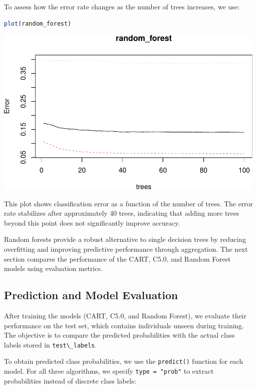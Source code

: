 \documentclass[
]{book}
\newcommand{\passthrough}[1]{#1}
\theoremstyle{definition}
\theoremstyle{definition}
\theoremstyle{definition}
\theoremstyle{definition}
\theoremstyle{remark}
\begin{document}
To assess how the error rate changes as the number of trees increases, we use:

\begin{lstlisting}[language=R]
plot(random_forest)
\end{lstlisting}

\begin{center}\includegraphics[width=0.7\linewidth]{tree_files/figure-latex/unnamed-chunk-20-1} \end{center}

This plot shows classification error as a function of the number of trees. The error rate stabilizes after approximately 40 trees, indicating that adding more trees beyond this point does not significantly improve accuracy.

Random forests provide a robust alternative to single decision trees by reducing overfitting and improving predictive performance through aggregation. The next section compares the performance of the CART, C5.0, and Random Forest models using evaluation metrics.

\subsection*{Prediction and Model Evaluation}\label{prediction-and-model-evaluation-1}

After training the models (CART, C5.0, and Random Forest), we evaluate their performance on the test set, which contains individuals unseen during training. The objective is to compare the predicted probabilities with the actual class labels stored in \passthrough{\lstinline!test\_labels!}.

To obtain predicted class probabilities, we use the \passthrough{\lstinline!predict()!} function for each model. For all three algorithms, we specify \passthrough{\lstinline!type = "prob"!} to extract probabilities instead of discrete class labels:
\end{document}
